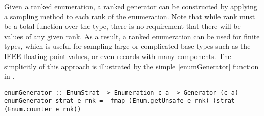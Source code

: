 \noindent
Given a ranked enumeration,
a ranked generator can be constructed by 
applying a sampling method to each rank of the enumeration.
Note that while rank must be a total function over the type,
there is no requirement that there will be values of any given rank.
As a result,  a ranked enumeration can be used for finite types,
which is useful for sampling large or complicated base types
such as the IEEE floating point values, or even records with many components.
The simplicitly of this approach is illustrated by the simple |enumGenerator| function in \GC.

\begin{lstlisting}
enumGenerator :: EnumStrat -> Enumeration c a -> Generator (c a)
enumGenerator strat e rnk =  fmap (Enum.getUnsafe e rnk) (strat (Enum.counter e rnk))
\end{lstlisting}

